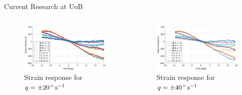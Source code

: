 \documentclass[aspectratio=169]{beamer}            %
\begin{document}
\begin{frame}{Current Research at UoB}

  \vspace{-1.5em}
	\begin{columns}
	  \begin{column}{0.5\textwidth}
		  \begin{figure}[!htb]
        \centering
			 \includegraphics[height=0.45\textwidth]{DistSens_StrainDynResponse_q20degps.eps}
			 \caption{Strain response for ${q = \SI{\pm 20}{\degree\per\second}}$}
			 \label{fig:DistSens_StrainDynResponse_q20degps}
      \end{figure}
		\end{column}
    \begin{column}{0.5\textwidth}
      \begin{figure}[!htb]
        \centering
			 \includegraphics[height=0.45\textwidth]{DistSens_StrainDynResponse_q50degps.eps}
			 \caption{Strain response for ${q = \SI{\pm 40}{\degree\per\second}}$}
			 \label{fig:DistSens_StrainDynResponse_q50degps}
      \end{figure}
		\end{column}
	\end{columns}

\end{frame}
\end{document}
